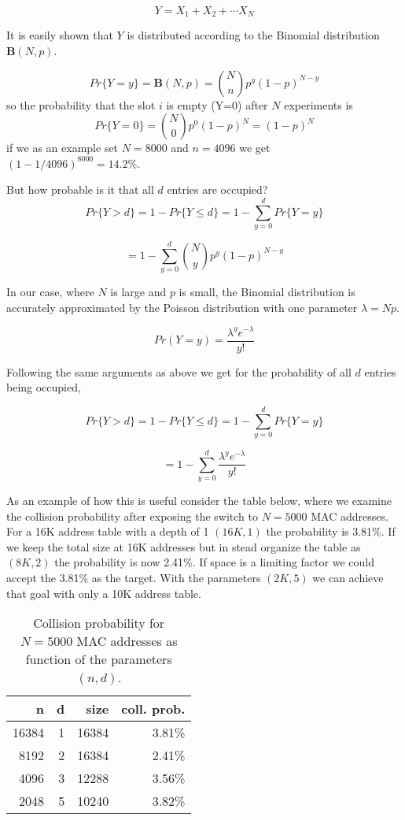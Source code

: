 $$
  Y = X_1 + X_2 + \cdots X_N
$$

It is easily shown \cite{Wackerly} that $Y$ is distributed according to the Binomial distribution $\mathbf{B}(N,p)$. 




$$
  Pr\{Y=y\} = \mathbf{B}(N,p) = \binom{N}{n}p^y(1-p)^{N-y}
$$
so the probability that the slot $i$ is empty (Y=0) after $N$ experiments is 
$$
   Pr\{Y=0\} = \binom{N}{0}p^0(1-p)^N = (1-p)^N
$$
if we as an example set $N=8000$ and $n=4096$ we get $(1-1/4096)^{8000} = 14.2\% $.

But how probable is it that all $d$ entries are occupied?
$$
  Pr\{Y>d\} = 1-Pr\{Y\le d\} = 1 - \sum_{y=0}^d Pr\{Y=y\}
$$

$$
  = 1- \sum_{y=0}^d \binom{N}{y} p^y (1-p)^{N-y}
$$

In our case, where $N$ is large and $p$ is small, the Binomial distribution is 
accurately approximated by the Poisson distribution with one parameter $\lambda = Np$.

$$
  Pr(Y=y) = \frac{\lambda^ye^{-\lambda}}{y!}
$$

Following the same arguments as above we get for the probability of all $d$ entries being occupied,

$$
  Pr\{Y > d\} = 1- Pr\{Y\le d \} = 1 - \sum_{y=0}^d Pr\{Y=y\}
$$

$$
 = 1 - \sum_{y=0}^d \frac{\lambda^ye^{-\lambda}}{y!}
$$

As an example of how this is useful consider the table below, where we examine the collision 
probability after exposing the switch to $N=5000$ MAC addresses. For a 16K address table with a depth
of 1 $(16K, 1)$ the probability is 3.81\%. If we keep the total size at 16K addresses but in stead
organize the table as $(8K, 2)$ the probability is now 2.41\%. If space is a limiting factor we 
could accept the 3.81\% as the target. With the parameters $(2K, 5)$ we can achieve that goal 
with only a 10K address table.

\begin{table}[h!]
\renewcommand{\arraystretch}{1.3}
\caption{Collision probability for $N=5000$ MAC addresses as function of the parameters $(n,d)$. }
\centering 
\begin{tabular}{rrrr}
\hline \hline
\bfseries n & \bfseries d & \bfseries size & \bfseries coll. prob. \\ 
\hline
16384 & 1 & 16384 & 3.81\% \\ 
8192  & 2 & 16384 &  2.41\% \\
4096  & 3 & 12288 & 3.56\% \\
2048  & 5 & 10240 & 3.82\% \\  
\hline
\end{tabular}

\end{table}

